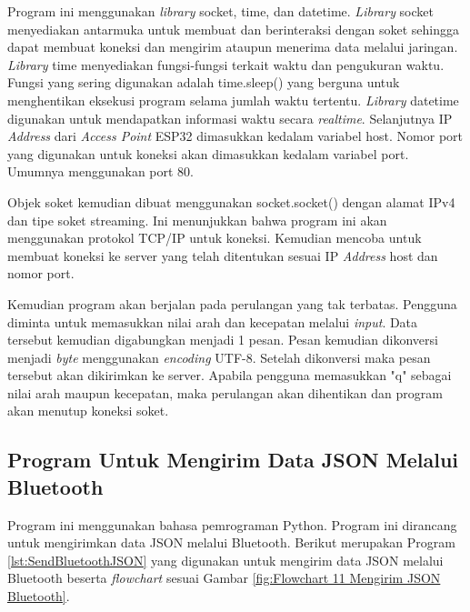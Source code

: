 Program ini menggunakan \emph{library} socket, time, dan datetime. \emph{Library} socket menyediakan antarmuka untuk membuat dan berinteraksi dengan soket sehingga dapat membuat koneksi dan mengirim ataupun menerima data melalui jaringan. \emph{Library} time menyediakan fungsi-fungsi terkait waktu dan pengukuran waktu. Fungsi yang sering digunakan adalah time.sleep() yang berguna untuk menghentikan eksekusi program selama jumlah waktu tertentu. \emph{Library} datetime digunakan untuk mendapatkan informasi waktu secara \emph{realtime}. Selanjutnya IP \emph{Address} dari \emph{Access Point} ESP32 dimasukkan kedalam variabel host. Nomor port yang digunakan untuk koneksi akan dimasukkan kedalam variabel port. Umumnya menggunakan port 80.

Objek soket kemudian dibuat menggunakan socket.socket() dengan alamat IPv4 dan tipe soket streaming. Ini menunjukkan bahwa program ini akan menggunakan protokol TCP/IP untuk koneksi. Kemudian mencoba untuk membuat koneksi ke server yang telah ditentukan sesuai IP \emph{Address} host dan nomor port.

Kemudian program akan berjalan pada perulangan yang tak terbatas. Pengguna diminta untuk memasukkan nilai arah dan kecepatan melalui \emph{input}. Data tersebut kemudian digabungkan menjadi 1 pesan. Pesan kemudian dikonversi menjadi \emph{byte} menggunakan \emph{encoding} UTF-8. Setelah dikonversi maka pesan tersebut akan dikirimkan ke server. Apabila pengguna memasukkan "q" sebagai nilai arah maupun kecepatan, maka perulangan akan dihentikan dan program akan menutup koneksi soket.

\subsection{Program Untuk Mengirim Data JSON Melalui Bluetooth}

Program ini menggunakan bahasa pemrograman Python. Program ini dirancang untuk mengirimkan data JSON melalui Bluetooth. Berikut merupakan Program \ref{lst:SendBluetoothJSON} yang digunakan untuk mengirim data JSON melalui Bluetooth beserta \emph{flowchart} sesuai Gambar \ref{fig:Flowchart 11 Mengirim JSON Bluetooth}.


